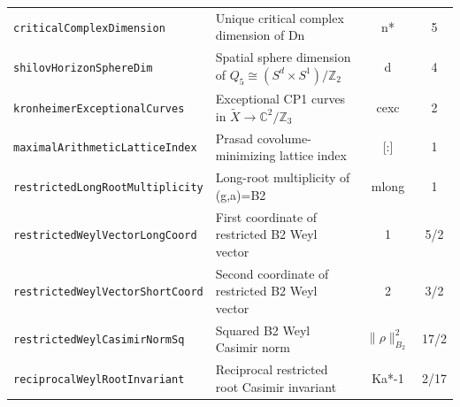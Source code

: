 \documentclass[11pt,reqno]{amsart}
\theoremstyle{definition}
\theoremstyle{remark}
\begin{document}
\begin{table}[htbp]
\begin{tabular}{@{}llcc@{}}
\texttt{criticalComplexDimension} & Unique critical complex dimension of Dn & n* & 5 \\
\texttt{shilovHorizonSphereDim} & Spatial sphere dimension of $Q_5 \cong (S^d \times S^1)/\mathbb{Z}_2$ & d & 4 \\
\texttt{kronheimerExceptionalCurves} & Exceptional CP1 curves in $\widetilde{X} \to \mathbb{C}^2/\mathbb{Z}_3$ & cexc & 2 \\
\texttt{maximalArithmeticLatticeIndex} & Prasad covolume-minimizing lattice index & [:] & 1 \\
\texttt{restrictedLongRootMultiplicity} & Long-root multiplicity of (g,a)=B2 & mlong & 1 \\
\texttt{restrictedWeylVectorLongCoord} & First coordinate of restricted B2 Weyl vector & 1 & 5/2 \\
\texttt{restrictedWeylVectorShortCoord} & Second coordinate of restricted B2 Weyl vector & 2 & 3/2 \\
\texttt{restrictedWeylCasimirNormSq} & Squared B2 Weyl Casimir norm & $\|\rho\|_{B_2}^2$ & 17/2 \\
\texttt{reciprocalWeylRootInvariant} & Reciprocal restricted root Casimir invariant & Ka*-1 & 2/17 \\
\bottomrule
\end{tabular}
\end{table}
\end{document}
